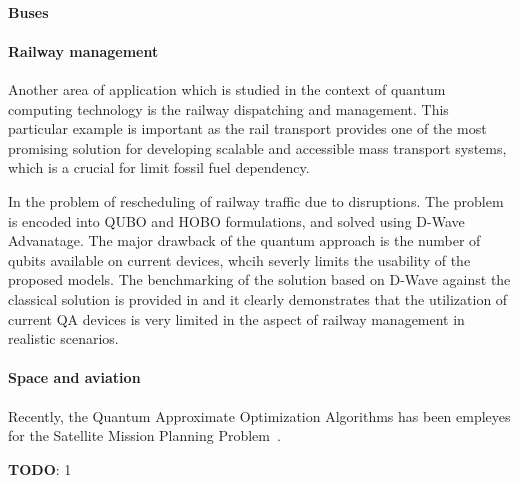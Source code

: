 \documentclass[a4paper,11pt]{article}
\newcommand{\todo}[1]{\noindent\textbf{TODO}: #1 \newline\vspace{12pt}}
\begin{document}
%

\paragraph{Buses}
 \cite{yarkoni2020quantum}

 
\paragraph{Railway management}

Another area of application which is studied in the context of quantum computing technology is the railway dispatching and management. This particular example is important as the rail transport provides one of the most promising solution for developing scalable and accessible mass transport systems, which is a crucial for limit fossil fuel dependency.


In \cite{domino2022quadratic} the problem of rescheduling of railway traffic due to disruptions. The problem is encoded into QUBO and HOBO formulations, and solved using D-Wave Advanatage. The major drawback of the quantum approach is the number of qubits available on current devices, whcih severly limits the usability of the proposed models. The benchmarking of the solution based on D-Wave against the classical solution is provided in \cite{domino2023quantum} and it clearly demonstrates that the utilization of current QA devices is very limited in the aspect of railway management in realistic scenarios. 


\paragraph{Space and aviation}

Recently, the Quantum Approximate Optimization Algorithms has been empleyes for the Satellite Mission Planning Problem~\cite{quetschlich2023satellite}.

\todo{1}

\end{document}
